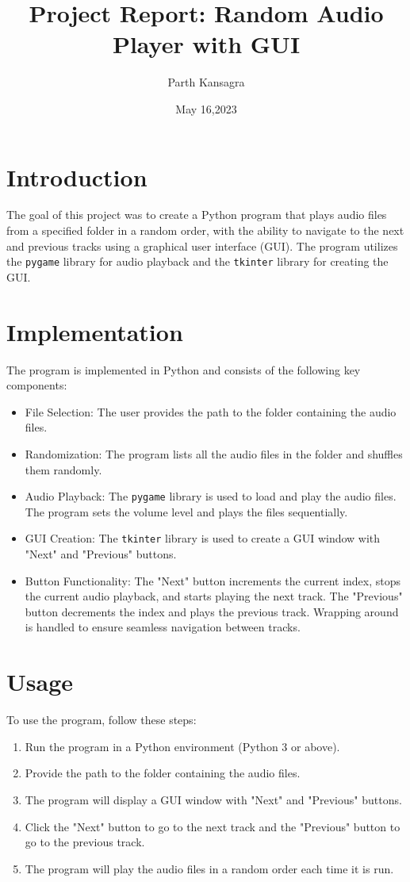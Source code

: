 \documentclass{article}
\begin{document}
\title{Project Report: Random Audio Player with GUI}
\author{Parth Kansagra}
\date{May 16,2023}

\maketitle

\section{Introduction}
The goal of this project was to create a Python program that plays audio files from a specified folder in a random order, with the ability to navigate to the next and previous tracks using a graphical user interface (GUI). The program utilizes the \texttt{pygame} library for audio playback and the \texttt{tkinter} library for creating the GUI.

\section{Implementation}
The program is implemented in Python and consists of the following key components:

\begin{itemize}
  \item File Selection: The user provides the path to the folder containing the audio files.
  \item Randomization: The program lists all the audio files in the folder and shuffles them randomly.
  \item Audio Playback: The \texttt{pygame} library is used to load and play the audio files. The program sets the volume level and plays the files sequentially.
  \item GUI Creation: The \texttt{tkinter} library is used to create a GUI window with "Next" and "Previous" buttons.
  \item Button Functionality: The "Next" button increments the current index, stops the current audio playback, and starts playing the next track. The "Previous" button decrements the index and plays the previous track. Wrapping around is handled to ensure seamless navigation between tracks.
\end{itemize}

\section{Usage}
To use the program, follow these steps:
\begin{enumerate}
  \item Run the program in a Python environment (Python 3 or above).
  \item Provide the path to the folder containing the audio files.
  \item The program will display a GUI window with "Next" and "Previous" buttons.
  \item Click the "Next" button to go to the next track and the "Previous" button to go to the previous track.
  \item The program will play the audio files in a random order each time it is run.
\end{enumerate}
\end{document}
